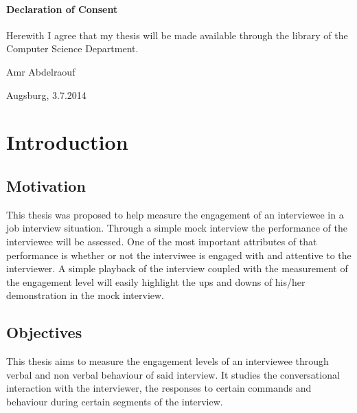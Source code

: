 \documentclass[12pt, a4paper, fleqn]{memoir}%
\begin{document}
\subsubsection*{\LARGE Declaration of Consent}
Herewith I agree that my thesis will be made available through the library of the Computer Science Department.
\vfill
\begin{flushleft}
Amr Abdelraouf
\end{flushleft}  
\begin{flushright}
Augsburg, 3.7.2014 
\end{flushright}
\vfill

\cleardoublepage
\rmfamily
\normalfont
{}
\pagestyle{headings}
\tableofcontents


\mainmatter

\chapter{Introduction}
\label{chap:Introduction}

\section{Motivation}
\label{sec:Motivation}
This thesis was proposed to help measure the engagement of an interviewee in a job interview situation. Through a simple mock interview the performance of the interviewee will be assessed. One of the most important attributes of that performance is whether or not the interviwee is engaged with and attentive to the interviewer. A simple playback of the interview coupled with the measurement of the engagement level will easily highlight the ups and downs of his/her demonstration in the mock interview.

\section{Objectives}
\label{sec:Objectives}
This thesis aims to measure the engagement levels of an interviewee through verbal and non verbal behaviour of said interview. It studies the conversational interaction with the interviewer, the responses to certain commands and behaviour during certain segments of the interview.
\end{document}
